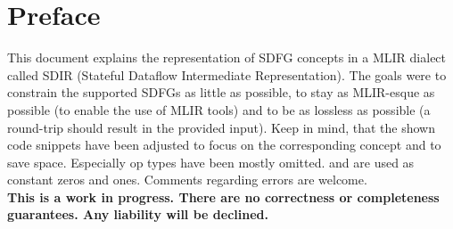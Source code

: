 \section{Preface}
This document explains the representation of SDFG concepts in a MLIR dialect called SDIR (Stateful Dataflow Intermediate Representation). The goals were to constrain the supported SDFGs as little as possible, to stay as MLIR-esque as possible (to enable the use of MLIR tools) and to be as lossless as possible (a round-trip should result in the provided input). 
Keep in mind, that the shown code snippets have been adjusted to focus on the corresponding concept and to save space. Especially op types have been mostly omitted.  and  are used as constant zeros and ones. Comments regarding errors are welcome.\\

\textbf{This is a work in progress. There are no correctness or completeness guarantees. Any liability will be declined.}